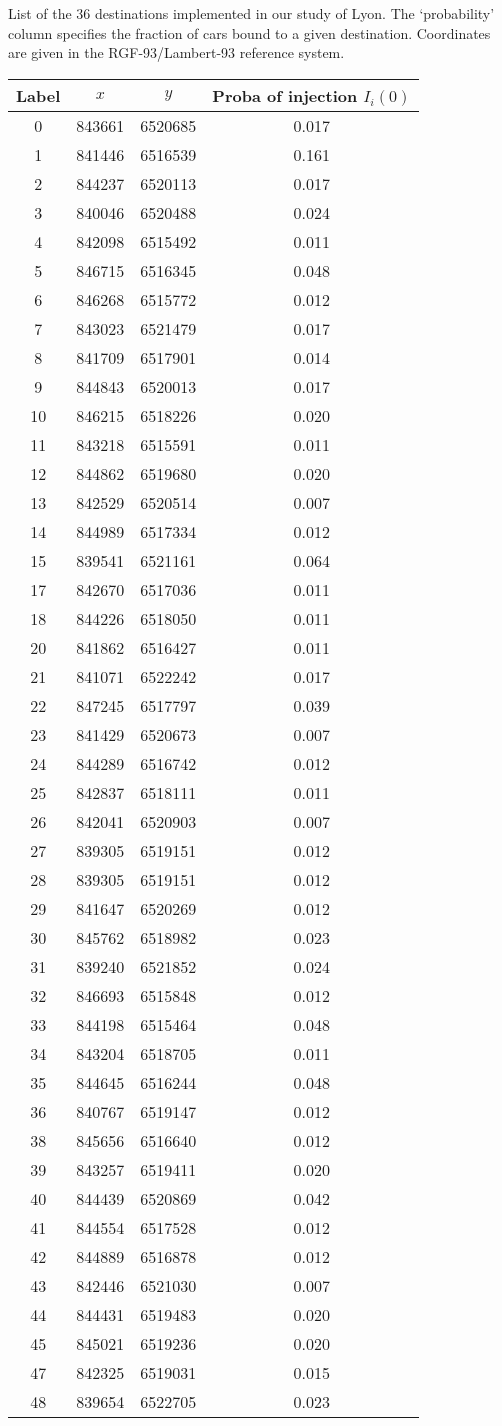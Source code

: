 \documentclass[trsc,reprint]{informs3}
\begin{document}
\begin{APPENDICES}
\begin{table}[h]
\caption{\label{tab:SI_destinations}List of the 36 destinations implemented in our study of Lyon. The `probability' column specifies the fraction of cars bound to a given destination. Coordinates are given in the RGF-93/Lambert-93 reference system.}
\end{table}

\clearpage


\begin{table}[H]
\begin{longtable}[c]{|c|c|c|c|}
\hline 
Label  & $x$ & $y$ & Proba of injection $I_i(0)$\tabularnewline
\hline 
\endhead
\hline 
0&843661&6520685&0.017\tabularnewline \hline
1&841446&6516539&0.161\tabularnewline \hline
2&844237&6520113&0.017\tabularnewline \hline
3&840046&6520488&0.024\tabularnewline \hline
4&842098&6515492&0.011\tabularnewline \hline
5&846715&6516345&0.048\tabularnewline \hline
6&846268&6515772&0.012\tabularnewline \hline
7&843023&6521479&0.017\tabularnewline \hline
8&841709&6517901&0.014\tabularnewline \hline
9&844843&6520013&0.017\tabularnewline \hline
10&846215&6518226&0.020\tabularnewline \hline
11&843218&6515591&0.011\tabularnewline \hline
12&844862&6519680&0.020\tabularnewline \hline
13&842529&6520514&0.007\tabularnewline \hline
14&844989&6517334&0.012\tabularnewline \hline
15&839541&6521161&0.064\tabularnewline \hline
17&842670&6517036&0.011\tabularnewline \hline
18&844226&6518050&0.011\tabularnewline \hline
20&841862&6516427&0.011\tabularnewline \hline
21&841071&6522242&0.017\tabularnewline \hline
22&847245&6517797&0.039\tabularnewline \hline
23&841429&6520673&0.007\tabularnewline \hline
24&844289&6516742&0.012\tabularnewline \hline
25&842837&6518111&0.011\tabularnewline \hline
26&842041&6520903&0.007\tabularnewline \hline
27&839305&6519151&0.012\tabularnewline \hline
28&839305&6519151&0.012\tabularnewline \hline
29&841647&6520269&0.012\tabularnewline \hline
30&845762&6518982&0.023\tabularnewline \hline
31&839240&6521852&0.024\tabularnewline \hline
32&846693&6515848&0.012\tabularnewline \hline
33&844198&6515464&0.048\tabularnewline \hline
34&843204&6518705&0.011\tabularnewline \hline
35&844645&6516244&0.048\tabularnewline \hline
36&840767&6519147&0.012\tabularnewline \hline
38&845656&6516640&0.012\tabularnewline \hline
39&843257&6519411&0.020\tabularnewline \hline
40&844439&6520869&0.042\tabularnewline \hline
41&844554&6517528&0.012\tabularnewline \hline
42&844889&6516878&0.012\tabularnewline \hline
43&842446&6521030&0.007\tabularnewline \hline
44&844431&6519483&0.020\tabularnewline \hline
45&845021&6519236&0.020\tabularnewline \hline
47&842325&6519031&0.015\tabularnewline \hline
48&839654&6522705&0.023\tabularnewline \hline


\end{longtable}
\end{table}
\end{APPENDICES}
\end{document}
